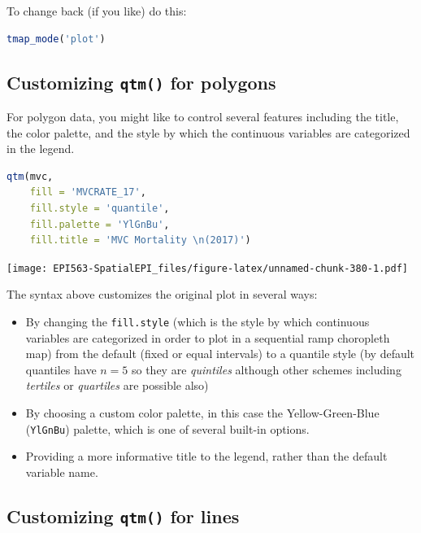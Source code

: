 \documentclass[
]{book}
\newcommand{\passthrough}[1]{#1}
\providecommand{\tightlist}{%
  \setlength{\itemsep}{0pt}\setlength{\parskip}{0pt}}
\begin{document}
To change back (if you like) do this:

\begin{lstlisting}[language=R]
tmap_mode('plot')
\end{lstlisting}

\hypertarget{customizing-qtm-for-polygons}{%
\subsection{\texorpdfstring{Customizing \texttt{qtm()} for polygons}{Customizing qtm() for polygons}}\label{customizing-qtm-for-polygons}}

For polygon data, you might like to control several features including the title, the color palette, and the style by which the continuous variables are categorized in the legend.

\begin{lstlisting}[language=R]
qtm(mvc,
    fill = 'MVCRATE_17', 
    fill.style = 'quantile', 
    fill.palette = 'YlGnBu',
    fill.title = 'MVC Mortality \n(2017)')
\end{lstlisting}

\texttt{[image: EPI563-SpatialEPI\_files/figure-latex/unnamed-chunk-380-1.pdf]}

The syntax above customizes the original plot in several ways:

\begin{itemize}
\tightlist
\item
  By changing the \passthrough{\lstinline!fill.style!} (which is the style by which continuous variables are categorized in order to plot in a sequential ramp choropleth map) from the default (fixed or equal intervals) to a quantile style (by default quantiles have \(n=5\) so they are \emph{quintiles} although other schemes including \emph{tertiles} or \emph{quartiles} are possible also)
\item
  By choosing a custom color palette, in this case the Yellow-Green-Blue (\passthrough{\lstinline!YlGnBu!}) palette, which is one of several built-in options.
\item
  Providing a more informative title to the legend, rather than the default variable name.
\end{itemize}

\hypertarget{customizing-qtm-for-lines}{%
\subsection{\texorpdfstring{Customizing \texttt{qtm()} for lines}{Customizing qtm() for lines}}\label{customizing-qtm-for-lines}}
\end{document}
